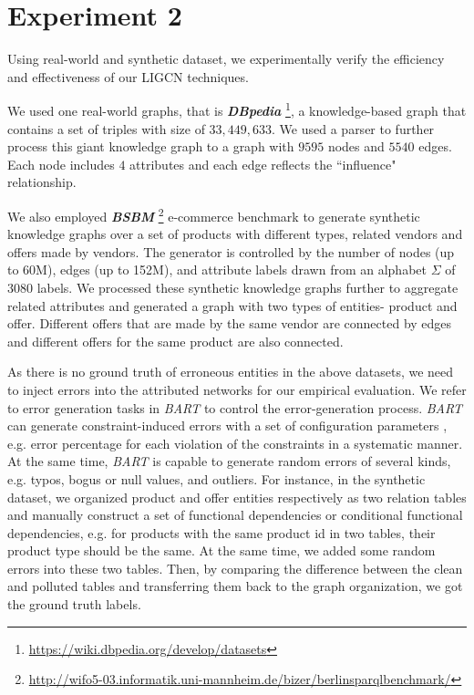 \section{Experiment 2}
\label{sec-expt}

Using real-world and synthetic dataset, we experimentally verify the efficiency and effectiveness of our LIGCN techniques.

 We used one real-world graphs, that is \textbf{{\em DBpedia}} \footnote{\scriptsize\url{https://wiki.dbpedia.org/develop/datasets}}, a knowledge-based graph that contains a set of triples with size of $33,449,633$. We used a parser to further process this giant knowledge graph to a graph with $9595$ nodes and $5540$ edges.
Each node includes $4$ attributes and each edge reflects the ``influence" relationship.

We also employed \textbf{{\em BSBM}} \footnote{\scriptsize\url{http://wifo5-03.informatik.uni-mannheim.de/bizer/berlinsparqlbenchmark/}}
e-commerce benchmark to generate synthetic knowledge graphs over a set of products with different
types, related vendors and offers made by vendors. The generator is
controlled by the number of nodes (up to 60M), edges (up to
152M), and attribute labels drawn from an alphabet $\Sigma$ of $3080$ labels. We processed these synthetic knowledge graphs further to aggregate related attributes and generated a graph with two types of entities- product and offer. Different offers that are made by the same vendor are connected by edges and different offers for the same product are also connected. 

As there is no ground truth of erroneous entities in the above datasets, we need to inject errors into the attributed networks for our empirical evaluation. We refer to error generation tasks in {\em BART} \cite{arocena2015messing} to control the error-generation process. {\em BART} can generate constraint-induced errors with a set of configuration parameters , e.g. error percentage for each violation of the constraints in a systematic manner. At the same time, {\em BART} is capable to generate random errors of several kinds, e.g. typos, bogus or null values, and outliers. For instance, in the synthetic dataset, we organized product and offer entities respectively as two relation tables and manually construct a set of functional dependencies or conditional functional dependencies,  e.g. for products with the same product id in two tables, their product type should be the same. At the same time, we added some random errors into these two tables. Then, by comparing the difference between the clean and polluted tables and transferring them back to the graph organization, we got the ground truth labels.

